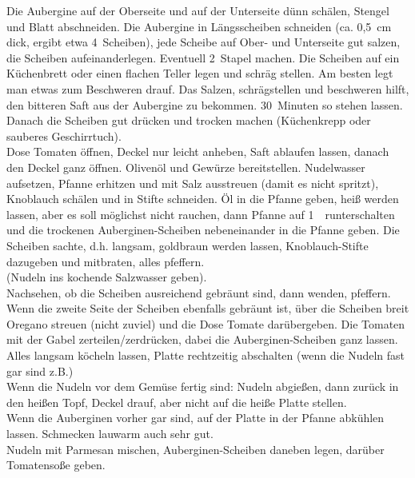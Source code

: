       \begin{zubereitung}
        Die Aubergine auf der Oberseite und auf der Unterseite dünn schälen,
	Stengel und Blatt abschneiden. Die Aubergine in Längsscheiben schneiden
	(ca. 0,5~cm dick, ergibt etwa 4~Scheiben), jede Scheibe auf Ober- und
	Unterseite gut salzen, die Scheiben aufeinanderlegen. Eventuell
	2~Stapel machen. Die Scheiben auf ein Küchenbrett oder einen flachen
	Teller legen und schräg stellen. Am besten legt man etwas zum
	Beschweren drauf. Das Salzen, schrägstellen und beschweren hilft, den
	bitteren Saft aus der Aubergine zu bekommen. 30~Minuten so stehen
	lassen. Danach die Scheiben gut drücken und trocken machen (Küchenkrepp
	oder sauberes Geschirrtuch). \\
        Dose Tomaten öffnen, Deckel nur leicht anheben, Saft ablaufen lassen,
	danach den Deckel ganz öffnen. Olivenöl und Gewürze bereitstellen.
	Nudelwasser aufsetzen, Pfanne erhitzen und mit Salz ausstreuen (damit
	es nicht spritzt), Knoblauch schälen und in Stifte schneiden. Öl in die
	Pfanne geben, heiß werden lassen, aber es soll möglichst nicht rauchen,
	dann Pfanne auf 1~\breh{}~runterschalten und die trockenen
	Auberginen-Scheiben nebeneinander in die Pfanne geben. Die Scheiben
	sachte, d.h. langsam, goldbraun werden lassen, Knoblauch-Stifte
	dazugeben und mitbraten, alles pfeffern. \\
        (Nudeln ins kochende Salzwasser geben). \\
        Nachsehen, ob die Scheiben ausreichend gebräunt sind, dann wenden,
	pfeffern. Wenn die zweite Seite der Scheiben ebenfalls gebräunt ist,
	über die Scheiben breit Oregano streuen (nicht zuviel) und die Dose
	Tomate darübergeben. Die Tomaten mit der Gabel zerteilen/zerdrücken,
	dabei die Auberginen-Scheiben ganz lassen. Alles langsam köcheln
	lassen, Platte rechtzeitig abschalten (wenn die Nudeln fast gar sind
	z.B.) \\
        Wenn die Nudeln vor dem Gemüse fertig sind: Nudeln abgießen, dann
	zurück in den heißen Topf, Deckel drauf, aber nicht auf die heiße
	Platte stellen. \\
        Wenn die Auberginen vorher gar sind, auf der Platte in der Pfanne
	abkühlen lassen. Schmecken lauwarm auch sehr gut. \\
        Nudeln mit Parmesan mischen, Auberginen-Scheiben daneben legen, darüber
	Tomatensoße geben. \\
      \end{zubereitung}


